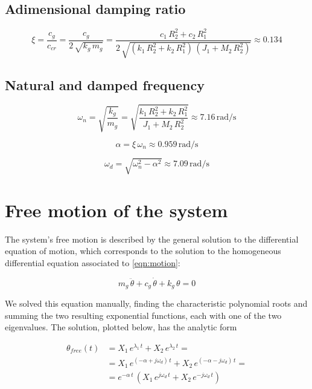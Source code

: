 \documentclass[a4paper,12pt,oneside]{article}
\begin{document}
\subsection{Adimensional damping ratio}

\begin{equation}
\label{eqn:damping_ratio}
	\xi = \frac{c_g}{c_{cr}} = %
		\frac{c_g}{2 \, \sqrt{k_g \, m_g}} %
		= \frac{c_1 \, R_2^2 + c_2 \, R_1^2} %
		{2 \, \sqrt{(k_1 \, R_2^2 + k_2 \, R_1^2) \, (J_1 + M_2 \, R_2^2)}} %
		\approx 0.134
\end{equation}

\subsection{Natural and damped frequency}

\[
	\omega_n = \sqrt{\frac{k_g}{m_g}} = %
		\sqrt{\frac{k_1 \, R_2^2 + k_2 \, R_1^2}{J_1 + M_2 \, R_2^2}} %
		\approx 7.16 \, \text{rad/s}
\]

\begin{equation}
\label{eqn:damping_factor}
  \alpha = \xi \, \omega_n \approx 0.959 \, \text{rad/s}
\end{equation}

\begin{equation}
\label{eqn:damped_frequency}
	\omega_d = \sqrt{\omega_n^2 - \alpha^2} \approx 7.09 \, \text{rad/s}
\end{equation}


\section{Free motion of the system}

The system's free motion is described by the general solution to the differential equation of motion, which corresponds to the solution to the homogeneous differential equation associated to \eqref{eqn:motion}:

\[ m_g \, \ddot{\theta} + c_g \, \dot{\theta} + k_g \, \theta = 0 \]

We solved this equation manually, finding the characteristic polynomial roots and summing the two resulting exponential functions, each with one of the two eigenvalues. The solution, plotted below, has the analytic form

\[ \begin{split}
	\theta_{free}(t) & = X_1 \, e^{\lambda_1 \, t} + X_2 \, e^{\lambda_2 \, t} = \\
									 & = X_1 \, e^{(-\alpha + j \omega_d) \, t} + %
									 	X_2 \, e^{(-\alpha - j \omega_d) \, t} = \\
									 & = e^{-\alpha \, t} \, %
										(X_1 \, e^{j \omega_d \, t} + X_2 \, e^{- j \omega_d \, t})
\end{split} \]
\end{document}
